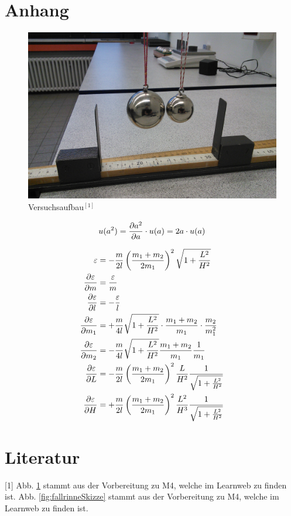 \documentclass[11pt,a4paper,titlepage, ngerman]{article}
\begin{document}
	\vspace{2cm} 
	
	 
	\newpage
	 
	
	
	\newpage
	
	\section{Anhang} 
		
	\begin{figure}[ht]
		\centering
		\includegraphics[width=\textwidth]{M4_1.jpg}
		\caption{Versuchsaufbau$^{[1]}$}
		\label{abb:VersuchsaufbauStoss}	
	\end{figure}

	\begin{equation}
		\label{eq:unce_auslenkung2}
		u(a^2) = \pdv{a^2}{a} \cdot u(a) = 2 a \cdot u(a)
	\end{equation}

	\begin{align}
		\label{eq:epsilon}
		\varepsilon &= -\frac{m}{2 l} \left( \frac{m_1 + m_2}{2 m_1}\right) ^2 \sqrt{1+\frac{L^2}{H^2}}\\
		\pdv{\varepsilon}{m} &= \frac{\varepsilon}{m}\\
		\pdv{\varepsilon}{l} &= -\frac{\varepsilon}{l}\\
		\pdv{\varepsilon}{m_1} &= +\frac{m}{4 l} \sqrt{1+\frac{L^2}{H^2}} \cdot \frac{m_1 + m_2}{m_1} \cdot \frac{m_2}{m_1^2}\\
		\pdv{\varepsilon}{m_2} &= -\frac{m}{4 l} \sqrt{1+\frac{L^2}{H^2}} \frac{m_1 + m_2}{m_1} \frac{1}{m_1}\\
		\pdv{\varepsilon}{L} &= -\frac{m}{2 l} \left( \frac{m_1 + m_2}{2 m_1}\right) ^2 \frac{L}{H^2}\frac{1}{\sqrt{1+\frac{L^2}{H^2}}}\\
		\pdv{\varepsilon}{H} &= +\frac{m}{2 l} \left( \frac{m_1 + m_2}{2 m_1}\right) ^2 \frac{L^2}{H^3}\frac{1}{\sqrt{1+\frac{L^2}{H^2}}}
		\label{eq:epsilonEnd}
	\end{align}
	
	\section*{Literatur}
	
	[1] Abb. \ref{abb:VersuchsaufbauStoss} stammt aus der Vorbereitung zu M4, welche im Learnweb zu finden ist.
	\newline
	[2] Abb. \ref{fig:fallrinneSkizze} stammt aus der Vorbereitung zu M4, welche im Learnweb zu finden ist.
	
\end{document}
